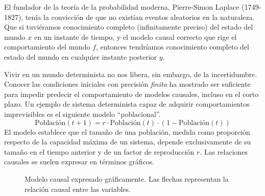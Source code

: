 \documentclass[a4paper,11pt]{book}
\theoremstyle{definition}
\begin{document}

El fundador de la teoría de la probabilidad moderna, Pierre-Simon Laplace (1749-1827), ten\'ia la convicci\'on de que no existían eventos aleatorios en la naturaleza.
%
Que si tuviéramos conocimiento completo (infinitamente preciso) del estado del mundo $x$ en un instante de tiempo, y el modelo causal correcto que rige el comportamiento del mundo $f$, entonces tendr\'iamos conocimiento completo del estado del mundo en cualquier instante posterior $y$.


Vivir en un mundo determinista no nos libera, sin embargo, de la incertidumbre.
%
Conocer las condiciones iniciales con precisi\'on \emph{finita} ha mostrado ser suficiente para impedir predecir el comportamiento de modelos causales, incluso en el corto plazo.
%
Un ejemplo de sistema determinista capaz de adquirir comportamientos imprevisibles es el siguiente modelo ``poblacional''.
%
\begin{equation}
 \text{Poblaci\'on}(t+1) = r \cdot \text{Poblaci\'on}(t)\cdot (1-\text{Poblaci\'on}(t))
\end{equation}
%
El modelo establece que el tama\~no de una poblaci\'on, medida como proporci\'on respecto de la capacidad m\'axima de un sistema, depende exclusivamente de su tama\~no en el tiempo anterior y de un factor de reproducci\'on $r$.
%
Las relaciones causales se suelen expresar en t\'erminos gr\'aficos.


\begin{figure}[ht!]
\centering
{}
\caption{Modelo causal expresado gr\'aficamente. Las flechas representan la relaci\'on causal entre las variables. }
\label{fig:modelo_poblacional}
\end{figure}

\end{document}
